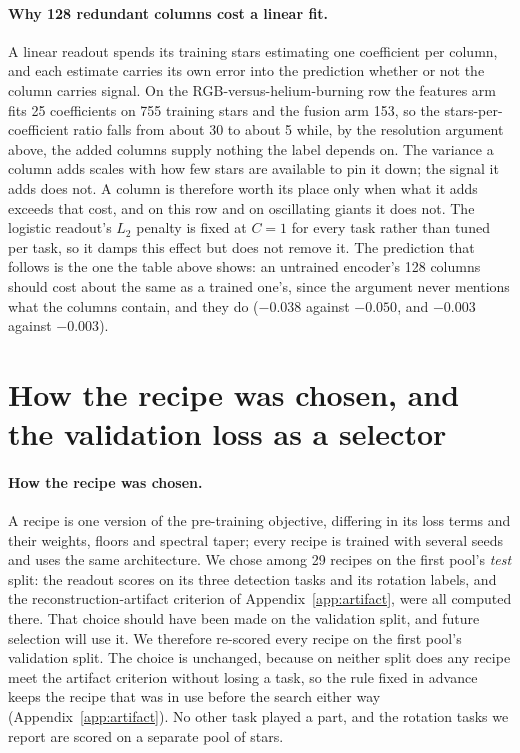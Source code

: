 \documentclass{article}
\begin{document}
\paragraph{Why 128 redundant columns cost a linear fit.} A linear readout spends its training stars
estimating one coefficient per column, and each estimate carries its own error into the prediction
whether or not the column carries signal. On the RGB-versus-helium-burning row the features arm fits
25 coefficients on 755 training stars and the fusion arm 153, so the stars-per-coefficient ratio
falls from about 30 to about 5 while, by the resolution argument above, the added columns supply
nothing the label depends on. The variance a column adds scales with how few stars are available to
pin it down; the signal it adds does not. A column is therefore worth its place only when what it
adds exceeds that cost, and on this row and on oscillating giants it does not. The logistic readout's
$L_{2}$ penalty is fixed at $C = 1$ for every task rather than tuned per task, so it damps this effect
but does not remove it. The prediction that follows is the one the table above shows: an untrained
encoder's 128 columns should cost about the same as a trained one's, since the argument never
mentions what the columns contain, and they do ($-0.038$ against $-0.050$, and $-0.003$ against
$-0.003$).

\section{How the recipe was chosen, and the validation loss as a selector}
\label{app:valloss}

\paragraph{How the recipe was chosen.} A recipe is one version of the pre-training objective,
differing in its loss terms and their weights, floors and spectral taper; every recipe is trained
with several seeds and uses the same architecture. We chose among 29 recipes on the first pool's
\emph{test} split: the readout scores on its three detection tasks and its rotation labels, and the
reconstruction-artifact criterion of Appendix~\ref{app:artifact}, were all computed there. That choice
should have been made on the validation split, and future selection will use it. We therefore
re-scored every recipe on the first pool's validation split. The choice is unchanged, because on
neither split does any recipe meet the artifact criterion without losing a task, so the rule fixed
in advance keeps the recipe that was in use before the search either way (Appendix~\ref{app:artifact}). No other task played
a part, and the rotation tasks we report are scored on a separate pool of stars.
\end{document}
